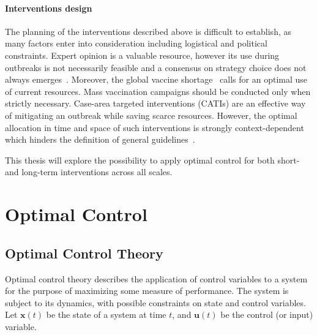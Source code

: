 \paragraph{Interventions design} The planning of the interventions described above is difficult to establish, as many factors enter into consideration including logistical and political constraints. Expert opinion is a valuable resource, however its use during outbreaks is not necessarily feasible and a consensus on strategy choice does not always emerges~\cite{cyranoski_cholera_2011}. Moreover, the global vaccine shortage~\cite{parker_adapting_2017,seidlein_preventing_2018} calls for an optimal use of current resources. Mass vaccination campaigns should be conducted only when strictly necessary. Case-area targeted interventions (CATIs) are an effective way of mitigating an outbreak while saving scarce resources. However, the optimal allocation in time and space of such interventions is strongly context-dependent which hinders the definition of general guidelines~\cite{eubank_modelling_2004, finger_potential_2018, seidlein_preventing_2018,azman_micro-hotspots_2018,lessler_mapping_2018,rebaudet_dry_2013}. 

This thesis will explore the possibility to apply optimal control for  both short- and long-term interventions across all scales. 

\section{Optimal Control}

\subsection{Optimal Control Theory}
Optimal control theory describes the application of control variables to a system for the purpose of maximizing some measure of performance. The system is subject to its dynamics, with possible constraints on state and control variables. Let $\textbf{x}(t)$ be the state of a system at time $t$, and $\textbf{u}(t)$ be the control (or input) variable. 

